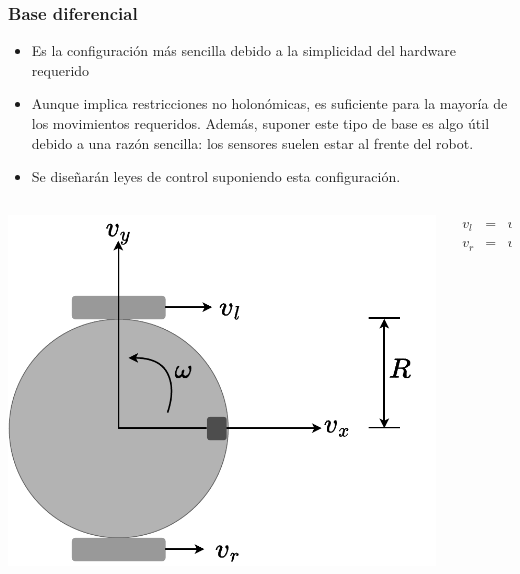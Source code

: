 \begin{frame}\frametitle{Base diferencial}
  \begin{itemize}
  \item Es la configuración más sencilla debido a la simplicidad del hardware requerido
  \item Aunque implica restricciones no holonómicas, es suficiente para la mayoría de los movimientos requeridos. Además, suponer este tipo de base es algo útil debido a una razón sencilla: los sensores suelen estar al frente del robot. 
  \item Se diseñarán leyes de control suponiendo esta configuración.
  \end{itemize}
  \begin{columns}
    \begin{column}{0.4\textwidth}
      \includegraphics[width=\textwidth]{Figures/MotionPlanning/DifferentialBase.pdf}
    \end{column}
    \begin{column}{0.6\textwidth}
      \begin{eqnarray*}
        v_l &=& v_x - R\omega\\
        v_r &=& v_x + R\omega
      \end{eqnarray*}
    \end{column}
  \end{columns}
\end{frame}

